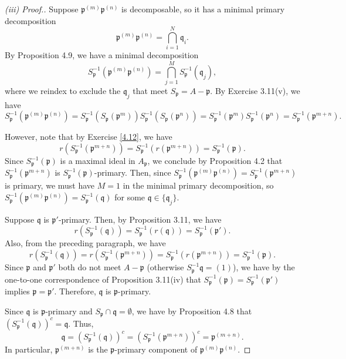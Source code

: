 \begin{proof}[(iii) Proof.]
Suppose $\mathfrak{p}^{(m)}\mathfrak{p}^{(n)}$ is decomposable, so it has a minimal primary decomposition
$$\mathfrak{p}^{(m)}\mathfrak{p}^{(n)} = \bigcap_{i=1}^N \mathfrak{q}_i.$$
By Proposition 4.9, we have a minimal decomposition
$$S_{\mathfrak{p}}^{-1}(\mathfrak{p}^{(m)}\mathfrak{p}^{(n)}) = \bigcap_{j=1}^M S_{\mathfrak{p}}^{-1}(\mathfrak{q}_j),$$
where we reindex to exclude the $\mathfrak{q}_j$ that meet $S_{\mathfrak{p}} = A - \mathfrak{p}$. By Exercise 3.11(v), we have
$$S_{\mathfrak{p}}^{-1}(\mathfrak{p}^{(m)}\mathfrak{p}^{(n)}) = S_{\mathfrak{p}}^{-1}(S_{\mathfrak{p}}(\mathfrak{p}^m))S_{\mathfrak{p}}^{-1}(S_{\mathfrak{p}}(\mathfrak{p}^{n}))
= S_{\mathfrak{p}}^{-1}(\mathfrak{p}^m)S_{\mathfrak{p}}^{-1}(\mathfrak{p}^n) = S_{\mathfrak{p}}^{-1}(\mathfrak{p}^{m+n}).$$

However, note that by Exercise \ref{4.12}, we have
$$r(S_{\mathfrak{p}}^{-1}(\mathfrak{p}^{m+n})) = S_{\mathfrak{p}}^{-1}(r(\mathfrak{p}^{m+n})) = S_{\mathfrak{p}}^{-1}(\mathfrak{p}).$$
Since $S_{\mathfrak{p}}^{-1}(\mathfrak{p})$ is a maximal ideal in $A_{\mathfrak{p}}$, we conclude by Proposition 4.2 that $S_{\mathfrak{p}}^{-1}(\mathfrak{p}^{m+n})$
is $S_{\mathfrak{p}}^{-1}(\mathfrak{p})$-primary. Then, since $S_{\mathfrak{p}}^{-1}(\mathfrak{p}^{(m)}\mathfrak{p}^{(n)}) = S_{\mathfrak{p}}^{-1}(\mathfrak{p}^{m+n})$ is primary, we must
have $M = 1$ in the minimal primary decomposition, so $S_{\mathfrak{p}}^{-1}(\mathfrak{p}^{(m)}\mathfrak{p}^{(n)}) = S_{\mathfrak{p}}^{-1}(\mathfrak{q})$ for some $\mathfrak{q} \in \{\mathfrak{q}_j\}$.

Suppose $\mathfrak{q}$ is $\mathfrak{p}'$-primary. Then, by Proposition 3.11, we have
$$r(S_{\mathfrak{p}}^{-1}(\mathfrak{q})) = S_{\mathfrak{p}}^{-1}(r(\mathfrak{q})) = S_{\mathfrak{p}}^{-1}(\mathfrak{p}').$$
Also, from the preceding paragraph, we have
$$r(S_{\mathfrak{p}}^{-1}(\mathfrak{q})) = r(S_{\mathfrak{p}}^{-1}(\mathfrak{p}^{m+n})) = S_{\mathfrak{p}}^{-1}(r(\mathfrak{p}^{m+n})) = S_{\mathfrak{p}}^{-1}(\mathfrak{p}).$$
Since $\mathfrak{p}$ and $\mathfrak{p}'$ both do not meet $A - \mathfrak{p}$ (otherwise $S_{\mathfrak{p}}^{-1}\mathfrak{q} = (1)$), we have by the one-to-one correspondence of 
Proposition 3.11(iv) that $S_{\mathfrak{p}}^{-1}(\mathfrak{p}) = S_{\mathfrak{p}}^{-1}(\mathfrak{p}')$ implies $\mathfrak{p} = \mathfrak{p}'$. Therefore, $\mathfrak{q}$
is $\mathfrak{p}$-primary.

Since $\mathfrak{q}$ is $\mathfrak{p}$-primary and $S_{\mathfrak{p}} \cap \mathfrak{q} = \emptyset$, we have by Proposition 4.8 that $(S_{\mathfrak{p}}^{-1}(\mathfrak{q}))^c = \mathfrak{q}$.
Thus,
$$\mathfrak{q} = (S_{\mathfrak{p}}^{-1}(\mathfrak{q}))^c = (S_{\mathfrak{p}}^{-1}(\mathfrak{p}^{m+n}))^c = \mathfrak{p}^{(m+n)}.$$
In particular, $\mathfrak{p}^{(m+n)}$ is the $\mathfrak{p}$-primary component of $\mathfrak{p}^{(m)}\mathfrak{p}^{(n)}$.
\end{proof}

